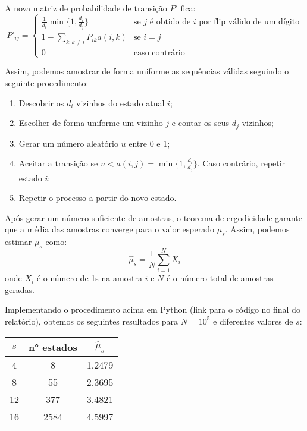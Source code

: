 \begin{itemize}
\begin{resposta}
    A nova matriz de probabilidade de transição $P'$ fica:
    $$ P'_{ij} = \begin{cases}
      \frac{1}{d_i}\min\{1, \frac{d_i}{d_j}\} & \text{se } j \text{ é obtido de } i \text{ por flip válido de um dígito} \\
      1-\sum_{k:k \neq i}P_{ik}a(i,k) & \text{se } i=j \\
      0 & \text{caso contrário}
    \end{cases} $$

    Assim, podemos amostrar de forma uniforme as sequências válidas seguindo o seguinte procedimento:
    \begin{enumerate}
      \item Descobrir os $d_i$ vizinhos do estado atual $i$;
      \item Escolher de forma uniforme um vizinho $j$ e contar os seus $d_j$ vizinhos;
      \item Gerar um número aleatório $u$ entre 0 e 1;
      \item Aceitar a transição se $u < a(i,j) = \min\{1, \frac{d_i}{d_j}\}$. Caso contrário, repetir estado $i$;
      \item Repetir o processo a partir do novo estado.
    \end{enumerate}

    Após gerar um número suficiente de amostras, o teorema de ergodicidade garante que a média das amostras converge para o valor esperado $\mu_s$. Assim, podemos estimar $\mu_s$ como:
    $$ \hat{\mu}_s = \frac{1}{N} \sum_{i=1}^{N} X_i $$
    onde $X_i$ é o número de 1s na amostra $i$ e $N$ é o número total de amostras geradas.

    Implementando o procedimento acima em Python (link para o código no final do relatório), obtemos os seguintes resultados para $N=10^5$ e diferentes valores de $s$:

    \begin{center}
    \begin{tabular}{|c|c|c|}
      \hline
      $s$ & n° estados & $\hat{\mu}_s$ \\
      \hline
      4 & 8 & 1.2479 \\
      8 & 55 & 2.3695 \\
      12 & 377 & 3.4821 \\
      16 & 2584 & 4.5997 \\
      \hline
    \end{tabular}
    \end{center}

  \end{resposta}
\end{itemize}